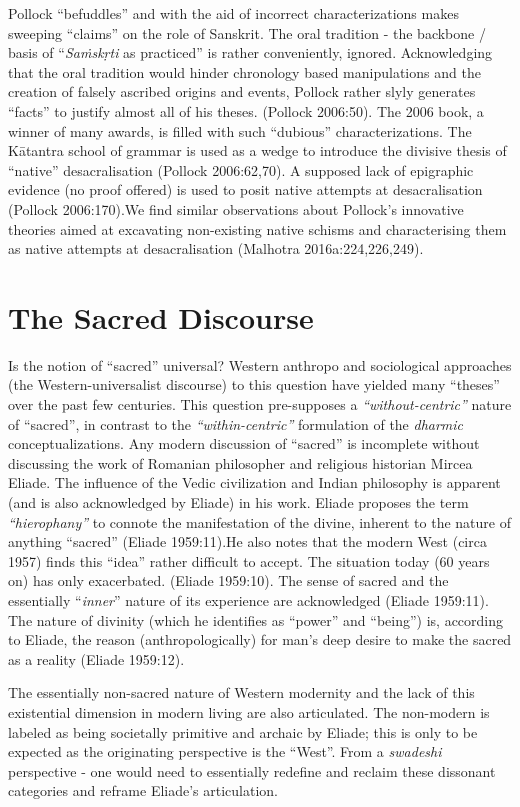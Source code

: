 Pollock “befuddles” and with the aid of incorrect characterizations makes sweeping “claims” on the role of Sanskrit. The oral tradition - the backbone / basis of “\textit{Saṁskṛti} as practiced” is rather conveniently, ignored. Acknowledging that the oral tradition would hinder chronology based manipulations and the creation of falsely ascribed origins and events, Pollock rather slyly generates “facts” to justify almost all of his theses. (Pollock 2006:50). The 2006 book, a winner of many awards, is filled with such “dubious” characterizations. The Kātantra school of grammar is used as a wedge to introduce the divisive thesis of “native” desacralisation (Pollock 2006:62,70). A supposed lack of epigraphic evidence (no proof offered) is used to posit native attempts at desacralisation (Pollock 2006:170).We find similar observations about Pollock's innovative theories aimed at excavating non-existing native schisms and characterising them as native attempts at desacralisation (Malhotra 2016a:224,226,249).


\section*{The Sacred Discourse}

Is the notion of “sacred” universal? Western anthropo and sociological approaches (the Western-universalist discourse) to this question have yielded many “theses” over the past few centuries. This question pre-supposes a \textit{“without-centric”} nature of “sacred”, in contrast to the \textit{“within-centric”} formulation of the \textit{dharmic} conceptualizations. Any modern discussion of “sacred” is incomplete without discussing the work of Romanian philosopher and religious historian Mircea Eliade. The influence of the Vedic civilization and Indian philosophy is apparent (and is also acknowledged by Eliade) in his work. Eliade proposes the term \textit{“hierophany”} to connote the manifestation of the divine, inherent to the nature of anything “sacred” (Eliade 1959:11).He also notes that the modern West (circa 1957) finds this “idea” rather difficult to accept. The situation today (60 years on) has only exacerbated. (Eliade 1959:10). The sense of sacred and the essentially “\textit{inner}” nature of its experience are acknowledged (Eliade 1959:11). The nature of divinity (which he identifies as “power” and “being”) is, according to Eliade, the reason (anthropologically) for man's deep desire to make the sacred as a reality (Eliade 1959:12).

The essentially non-sacred nature of Western modernity and the lack of this existential dimension in modern living are also articulated. The non-modern is labeled as being societally primitive and archaic by Eliade; this is only to be expected as the originating perspective is the “West”. From a \textit{swadeshi} perspective - one would need to essentially redefine and reclaim these dissonant categories and reframe Eliade's articulation.

